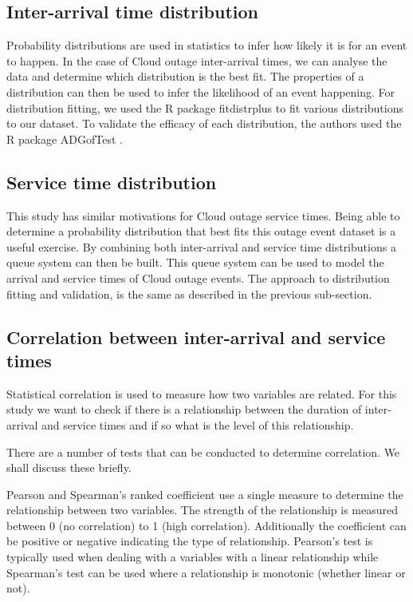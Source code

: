 \documentclass[5p]{elsarticle}
\begin{document}
\subsection{Inter-arrival time distribution}

Probability distributions are used in statistics to infer how likely it is for an event to happen. In the case of Cloud outage inter-arrival times,  we can analyse the data and determine which distribution is the best fit. The properties of a distribution can then be used to infer the likelihood of an event happening. For distribution fitting, we used the R package fitdistrplus \cite{fitdistrplus} to fit various distributions to our dataset. To validate the efficacy of each distribution,  the authors used the R package ADGofTest \cite{ADGoF}. 

\subsection{Service time distribution}

This study has similar motivations for Cloud outage service times. Being able to determine a probability distribution that best fits this outage event dataset is a useful exercise. By combining both inter-arrival and service time distributions a queue system can then be built. This queue system can be used to model the arrival and service times of Cloud outage events. The approach to distribution fitting and validation, is the same as described in the previous sub-section. 

\subsection{Correlation between inter-arrival and service times}

Statistical correlation is used to measure how two variables are related. For this study we want to check if there is a relationship between the duration of inter-arrival and service times and if so what is the level of this relationship. 

There are a number of tests that can be conducted to determine correlation. We shall discuss these briefly.

Pearson \cite{fisher1915frequency} and Spearman's \cite{spearman1904proof} ranked coefficient use a single measure to determine the relationship between two variables. The strength of the relationship is measured between 0 (no correlation) to 1 (high correlation). Additionally the coefficient can be positive or negative indicating the type of relationship. Pearson's test is typically used when dealing with a variables with a linear relationship while Spearman's test can be used where a relationship is monotonic (whether linear or not). 
\end{document}
